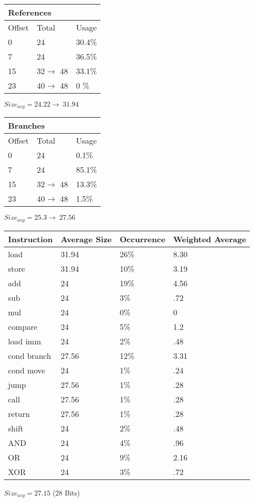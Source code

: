\documentclass{article}
\begin{document}
\begin{multicols}{3}
\begin{minipage}{\linewidth}
\begin{tabular}{|l|l|l|}
\hline
\multicolumn{3}{|l|}{References}\\
\hline
Offset & Total & Usage \\
\hline
0 & 24 & 30.4\%\\
7 & 24 & 36.5\%\\
15 & 32$\rightarrow$ 48 & 33.1\%\\
23 & 40$\rightarrow$ 48 & 0 \%\\
\hline
\end{tabular}\par
\bigskip
$Size_{avg}=24.22\rightarrow\ 31.94$\\

\begin{tabular}{|l|l|l|}
\hline
\multicolumn{3}{|l|}{Branches}\\
\hline
Offset & Total & Usage \\
\hline
0 & 24 & 0.1\%\\
7 & 24 & 85.1\%\\
15 & 32$\rightarrow$ 48 & 13.3\%\\
23 & 40$\rightarrow$ 48 & 1.5\%\\
\hline
\end{tabular}\par
\bigskip
$Size_{avg}=25.3\rightarrow\ 27.56$\\
\end{minipage}
\vfill
\columnbreak
\begin{minipage}{\linewidth}
\begin{tabular}{|l|l|l|l|}
\hline
Instruction & Average Size & Occurrence & Weighted Average \\
\hline
load & 31.94 & 26\% & 8.30 \\
store & 31.94 & 10\% & 3.19  \\
add & 24 & 19\% & 4.56 \\
sub & 24 & 3\% & .72\\
mul & 24 & 0\% & 0 \\
compare & 24 & 5\% & 1.2 \\
load imm & 24 & 2\% & .48\\
cond branch & 27.56 & 12\% & 3.31\\
cond move & 24 & 1\% & .24\\
jump & 27.56 & 1\% & .28\\ 
call & 27.56 & 1\% & .28\\
return & 27.56 & 1\% & .28\\
shift & 24 & 2\% & .48 \\
AND & 24 & 4\% & .96 \\
OR & 24 & 9\% & 2.16\\
XOR & 24 & 3\% & .72 \\
\hline
\end{tabular}\par
\bigskip
$Size_{avg}=27.15$ (28 Bits)\\
\end{minipage}
\end{multicols}
\vspace{5mm}
\end{document}
